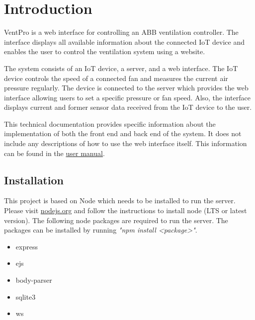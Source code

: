 
\chapter{Introduction}
\label{ch:introduction}

VentPro is a web interface for controlling an ABB ventilation controller. The interface displays all available information about the connected IoT device and enables the user to control the ventilation system using a website. 

The system consists of an IoT device, a server, and a web interface. The IoT device controls the speed of a connected fan and measures the current air pressure regularly. The device is connected to the server which provides the web interface allowing users to set a specific pressure or fan speed. Also, the interface displays current and former sensor data received from the IoT device to the user.

This technical documentation provides specific information about the implementation of both the front end and back end of the system. It does not include any descriptions of how to use the web interface itself. This information can be found in the  \href{https://github.com/sischae/Internet_of_Things_Project/blob/main/doc/user_manual/user_manual.pdf}{user manual}.





\section{Installation}
\label{sec:installation}

This project is based on Node which needs to be installed to run the server. Please visit \href{https://nodejs.org}{nodejs.org} and follow the instructions to install node (LTS or latest version). The following node packages are required to run the server. The packages can be installed by running \textit{"npm install <package>"}.

\begin{itemize}
	\item express
    \item ejs
    \item body-parser
    \item sqlite3
    \item ws
\end{itemize}

